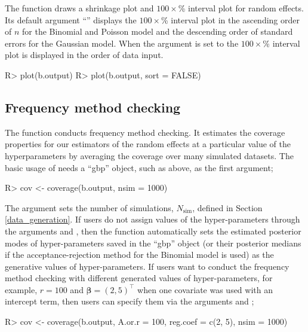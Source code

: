 \documentclass[article]{jss}
\begin{document}
The function  draws a shrinkage plot and $100\times$\% interval plot for random effects. Its default argument ``'' displays the $100\times$\% interval plot in the ascending order of $n$ for the Binomial and Poisson model and the descending order of standard errors for the Gaussian model. When the argument  is set to   the $100\times$\% interval plot is displayed in the order of data input.
\begin{CodeChunk}
\begin{CodeInput}
R> plot(b.output)
R> plot(b.output, sort = FALSE)
\end{CodeInput}
\end{CodeChunk}

\subsection{Frequency method checking}
The function  conducts frequency method checking. It estimates
the coverage properties for our estimators of the random effects at
a particular value of the hyperparameters by averaging the coverage over many simulated datasets. The basic usage of  needs a ``gbp'' object, such as  above, as the first argument;
\begin{CodeChunk}
\begin{CodeInput}
R> cov <- coverage(b.output, nsim = 1000)
\end{CodeInput}
\end{CodeChunk}

The argument  sets the number of simulations, $N_{\textrm{sim}}$, defined in Section \ref{data_generation}. If users do not assign values of the hyper-parameters through the arguments  and , then the function  automatically sets the estimated posterior modes of hyper-parameters saved in the ``gbp'' object (or their posterior medians if the acceptance-rejection method for the Binomial model is used) as the generative values of hyper-parameters. If users want to conduct the frequency method checking with different generated values of hyper-parameters, for example, $r=100$ and $\boldsymbol{\beta}=(2, 5)^\top$ when one covariate was used with an intercept term, then users can specify them via the arguments  and ;
\begin{CodeChunk}
\begin{CodeInput}
R> cov <- coverage(b.output, A.or.r = 100, reg.coef = c(2, 5), nsim = 1000)
\end{CodeInput}
\end{CodeChunk}
\end{document}
